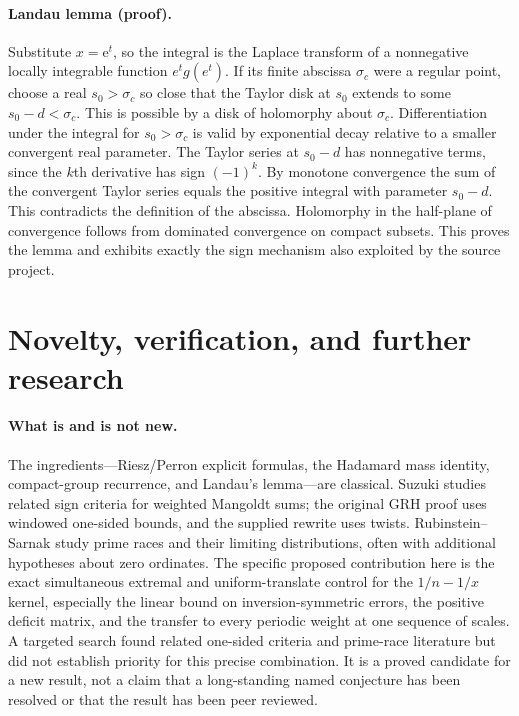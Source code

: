 \documentclass[11pt]{article}
\theoremstyle{remark}\newtheorem{remark}[theorem]{Remark}
\newcommand{\e}{\mathrm{e}}
\begin{document}
\paragraph{Landau lemma (proof).} Substitute $x=\e^t$, so the integral is the Laplace transform of a nonnegative locally integrable function $e^t g(e^t)$. If its finite abscissa $\sigma_c$ were a regular point, choose a real $s_0>\sigma_c$ so close that the Taylor disk at $s_0$ extends to some $s_0-d<\sigma_c$. This is possible by a disk of holomorphy about $\sigma_c$. Differentiation under the integral for $s_0>\sigma_c$ is valid by exponential decay relative to a smaller convergent real parameter. The Taylor series at $s_0-d$ has nonnegative terms, since the $k$th derivative has sign $(-1)^k$. By monotone convergence the sum of the convergent Taylor series equals the positive integral with parameter $s_0-d$. This contradicts the definition of the abscissa. Holomorphy in the half-plane of convergence follows from dominated convergence on compact subsets. This proves the lemma and exhibits exactly the sign mechanism also exploited by the source project.

\section{Novelty, verification, and further research}
\paragraph{What is and is not new.} The ingredients---Riesz/Perron explicit formulas, the Hadamard mass identity, compact-group recurrence, and Landau's lemma---are classical. Suzuki \cite{suzuki} studies related sign criteria for weighted Mangoldt sums; the original GRH proof uses windowed one-sided bounds, and the supplied rewrite uses twists. Rubinstein--Sarnak \cite{rs} study prime races and their limiting distributions, often with additional hypotheses about zero ordinates. The specific proposed contribution here is the exact simultaneous extremal and uniform-translate control for the $1/n-1/x$ kernel, especially the linear bound on inversion-symmetric errors, the positive deficit matrix, and the transfer to every periodic weight at one sequence of scales. A targeted search found related one-sided criteria and prime-race literature but did not establish priority for this precise combination. It is a proved candidate for a new result, not a claim that a long-standing named conjecture has been resolved or that the result has been peer reviewed.
\end{document}
